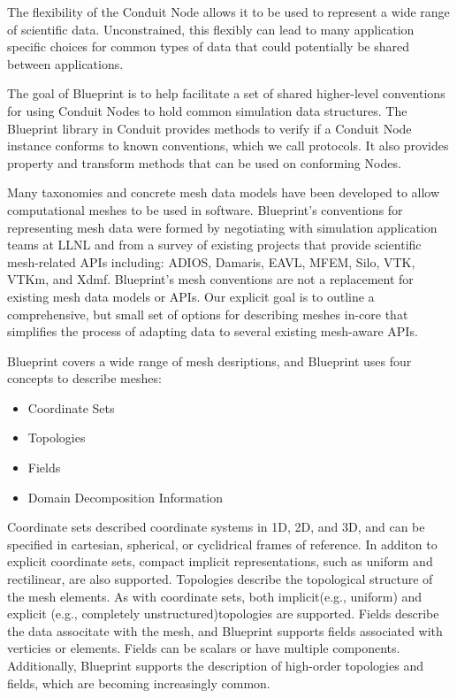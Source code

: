 
The flexibility of the Conduit Node allows it to be used to represent a
wide range of scientific data.
%
Unconstrained, this flexibly can lead to
many application specific choices for common types of data that could
potentially be shared between applications.

The goal of Blueprint is to help facilitate a set of shared higher-level
conventions for using Conduit Nodes to hold common simulation data structures.
%
The Blueprint library in Conduit provides methods to verify if a Conduit
Node instance conforms to known conventions, which we call protocols.
%
It also provides property and transform methods that can be used on conforming Nodes.

Many taxonomies and concrete mesh data models have been developed to allow
computational meshes to be used in software.
%
Blueprint’s conventions for representing mesh data were formed by negotiating
with simulation application teams at LLNL and from a survey of existing
projects that provide scientific mesh-related APIs including: ADIOS, Damaris,
EAVL, MFEM, Silo, VTK, VTKm, and Xdmf.
%
Blueprint’s mesh conventions are not a replacement for existing mesh data
models or APIs.
%
Our explicit goal is to outline a comprehensive, but small set of options
for describing meshes in-core that simplifies the process of adapting data
to several existing mesh-aware APIs.

Blueprint covers a wide range of mesh desriptions, and
Blueprint uses four concepts to describe meshes:

\begin{itemize}
  \item Coordinate Sets
  \item Topologies
  \item Fields
  \item Domain Decomposition Information
\end{itemize}

Coordinate sets described coordinate systems in 1D, 2D, and 3D, and
can be specified in cartesian, spherical, or cyclidrical frames of reference.
%
In additon to explicit coordinate sets, compact implicit representations,
such as uniform and rectilinear, are also supported.
%
Topologies describe the topological structure of the mesh elements.
%
As with coordinate sets, both implicit(e.g., uniform) and explicit
(e.g., completely unstructured)topologies are supported.
%
Fields describe the data associtate with the mesh, and Blueprint supports
fields associated with verticies or elements.
%
Fields can be scalars or have multiple components.
%
Additionally, Blueprint supports the description of high-order
topologies and fields, which are becoming increasingly common.

